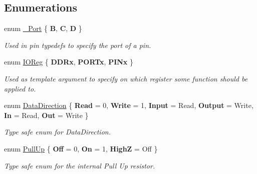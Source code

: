 \subsection*{Enumerations}
\begin{DoxyCompactItemize}
\item 
enum \hyperlink{namespaceports_a9949317f344930bd6ad1097e80c97b67}{\+\_\+\+Port} \{ \newline
{\bfseries B}, 
\newline
{\bfseries C}, 
\newline
{\bfseries D}
 \}\begin{DoxyCompactList}\small\item\em Used in pin {\ttfamily typedef}s to specify the port of a pin. \end{DoxyCompactList}
\item 
\hypertarget{namespaceports_aca1f1af9f1af73e71c6954b7dfb1bfa1}{}\label{namespaceports_aca1f1af9f1af73e71c6954b7dfb1bfa1} 
enum \hyperlink{namespaceports_aca1f1af9f1af73e71c6954b7dfb1bfa1}{I\+O\+Reg} \{ \newline
{\bfseries D\+D\+Rx}, 
\newline
{\bfseries P\+O\+R\+Tx}, 
\newline
{\bfseries P\+I\+Nx}
 \}\begin{DoxyCompactList}\small\item\em Used as template argument to specify on which register some function should be applied to. \end{DoxyCompactList}
\item 
enum \hyperlink{namespaceports_a46987e78fa447129742fadda5eccafb4}{Data\+Direction} \{ \newline
{\bfseries Read} = 0, 
\newline
{\bfseries Write} = 1, 
\newline
{\bfseries Input} = Read, 
\newline
{\bfseries Output} = Write, 
\newline
{\bfseries In} = Read, 
\newline
{\bfseries Out} = Write
 \}\begin{DoxyCompactList}\small\item\em Type safe enum for Data\+Direction. \end{DoxyCompactList}
\item 
enum \hyperlink{namespaceports_a49bf0ccedb4cfed89a328574e53bec07}{Pull\+Up} \{ \newline
{\bfseries Off} = 0, 
\newline
{\bfseries On} = 1, 
\newline
{\bfseries HighZ} = Off
 \}\begin{DoxyCompactList}\small\item\em Type safe enum for the internal Pull Up resistor. \end{DoxyCompactList}
\end{DoxyCompactItemize}
